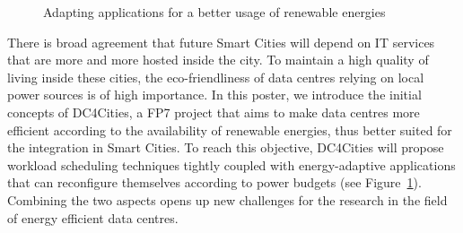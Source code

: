\documentclass[conference]{IEEEtran}
\begin{document}
\begin{figure}[ht!]
  \centering
  \caption{Adapting applications for a better usage of renewable energies}
  \label{fig:adapt}
  \vspace{-1em}
\end{figure}

There is broad agreement that future Smart Cities will depend on IT services that are more and more hosted inside the city.
To maintain a high quality of living inside these cities, the eco-friendliness of data centres relying on local power sources is of high importance.
In this poster, we introduce the initial concepts of DC4Cities, a FP7 project that aims to make data centres more efficient according to the availability of renewable energies, thus better suited for the integration in Smart Cities.
To reach this objective, DC4Cities will propose workload scheduling techniques tightly coupled with energy-adaptive applications that can reconfigure themselves according to power budgets (see Figure~\ref{fig:adapt}).
Combining the two aspects opens up new challenges for the research in the field of energy efficient data centres.
\end{document}
